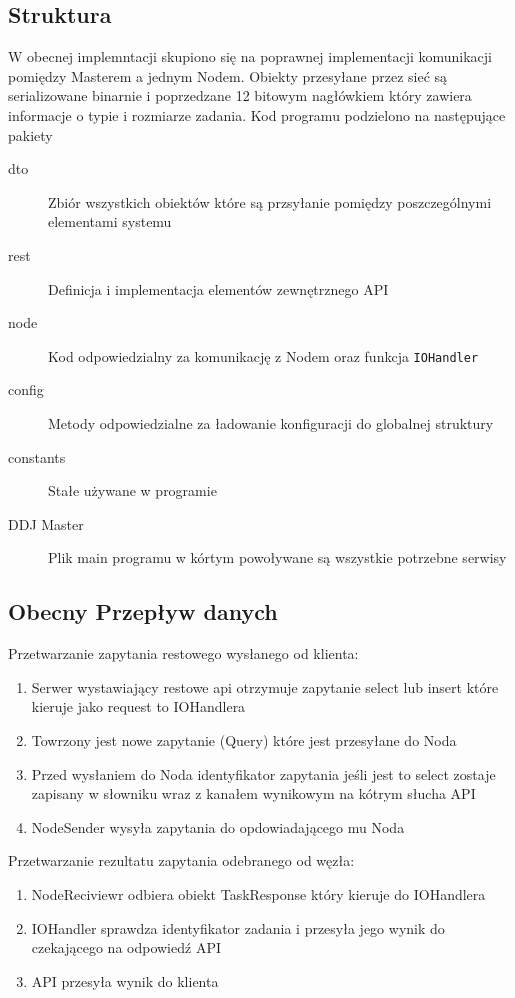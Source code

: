 \documentclass[paper=a4, fontsize=11pt]{scrartcl} %
\numberwithin{equation}{section} %
\numberwithin{figure}{section} %
\numberwithin{table}{section} %
\begin{document}
	\subsection{Struktura}
		W obecnej implemntacji skupiono się na poprawnej implementacji komunikacji pomiędzy Masterem a jednym Nodem.
		Obiekty przesyłane przez sieć są serializowane binarnie i poprzedzane 12 bitowym nagłówkiem który zawiera informacje
		o typie i rozmiarze zadania. Kod programu podzielono na następujące pakiety
		\begin{description}
			\item[dto] Zbiór wszystkich obiektów które są przsyłanie pomiędzy poszczególnymi elementami systemu
			\item[rest] Definicja i implementacja elementów zewnętrznego API
			\item[node] Kod odpowiedzialny za komunikację z Nodem oraz funkcja \texttt{IOHandler}
			\item[config] Metody odpowiedzialne za ładowanie konfiguracji do globalnej struktury
			\item[constants] Stałe używane w programie
			\item[DDJ Master] Plik main programu w kórtym powoływane są wszystkie potrzebne serwisy
		\end{description}

	\subsection{Obecny Przepływ danych}
		Przetwarzanie zapytania restowego wysłanego od klienta:
		\begin{enumerate}
			\item Serwer wystawiający restowe api otrzymuje zapytanie select lub insert które kieruje jako request to IOHandlera
			\item Towrzony jest nowe zapytanie (Query) które jest przesyłane do Noda
			\item Przed wysłaniem do Noda identyfikator zapytania jeśli jest to select zostaje zapisany w słowniku wraz z kanałem 
			wynikowym na kótrym słucha API
			\item NodeSender wysyła zapytania do opdowiadającego mu Noda
		\end{enumerate}
		Przetwarzanie rezultatu zapytania odebranego od węzła:
		\begin{enumerate}
			\item NodeReciviewr odbiera obiekt TaskResponse który kieruje do IOHandlera
			\item IOHandler sprawdza identyfikator zadania i przesyła jego wynik do czekającego na odpowiedź API
			\item API przesyła wynik do klienta
		\end{enumerate}
\end{document}

